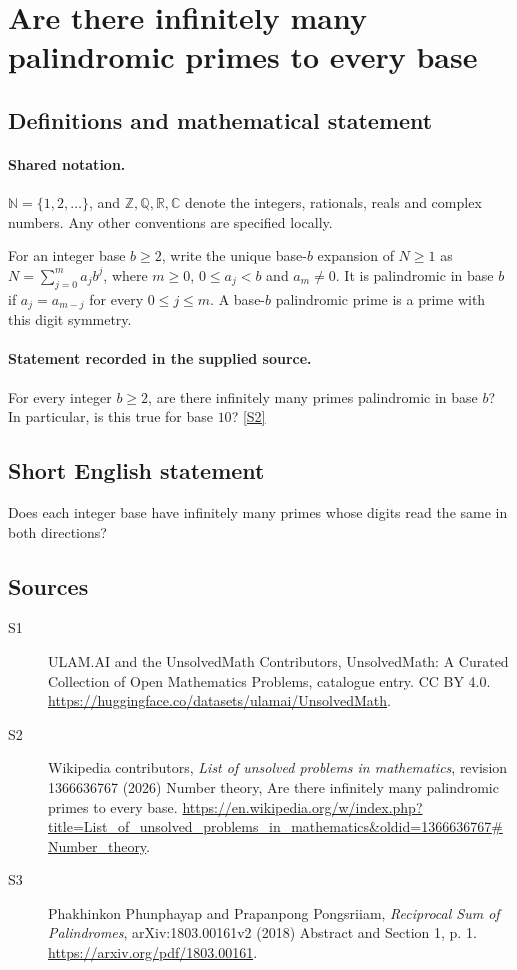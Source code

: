 \documentclass[11pt]{article}
\newcommand{\sref}[2]{\hyperlink{source:#1:#2}{[S#2]}}
\begin{document}
\section{Are there infinitely many palindromic primes to every base}\label{statement}

\subsection{Definitions and mathematical statement}

\paragraph{Shared notation.}$\mathbb N=\{1,2,\ldots\}$, and $\mathbb Z,\mathbb Q,\mathbb R,\mathbb C$ denote the integers, rationals, reals and complex numbers. Any other conventions are specified locally.


For an integer base $b\ge2$, write the unique base-$b$ expansion of $N\ge1$ as $N=\sum_{j=0}^m a_jb^j$, where $m\ge0$, $0\le a_j<b$ and $a_m\ne0$. It is palindromic in base $b$ if $a_j=a_{m-j}$ for every $0\le j\le m$. A base-$b$ palindromic prime is a prime with this digit symmetry.
\paragraph{Statement recorded in the supplied source.}
For every integer $b\ge2$, are there infinitely many primes palindromic in base $b$? In particular, is this true for base $10$? \sref{statement}{2}
\subsection{Short English statement}
Does each integer base have infinitely many primes whose digits read the same in both directions?
\subsection{Sources}
\begin{description}
\item[\hypertarget{source:statement:1}{S1}] ULAM.AI and the UnsolvedMath Contributors, UnsolvedMath: A Curated Collection of Open Mathematics Problems, catalogue entry. CC BY 4.0. \url{https://huggingface.co/datasets/ulamai/UnsolvedMath}.
\item[\hypertarget{source:statement:2}{S2}] Wikipedia contributors, \emph{List of unsolved problems in mathematics}, revision 1366636767 (2026) Number theory, Are there infinitely many palindromic primes to every base. \url{https://en.wikipedia.org/w/index.php?title=List_of_unsolved_problems_in_mathematics&oldid=1366636767#Number_theory}.
\item[\hypertarget{source:statement:3}{S3}] Phakhinkon Phunphayap and Prapanpong Pongsriiam, \emph{Reciprocal Sum of Palindromes}, arXiv:1803.00161v2 (2018) Abstract and Section 1, p. 1. \url{https://arxiv.org/pdf/1803.00161}.
\end{description}
\label{end:statement}
\end{document}
